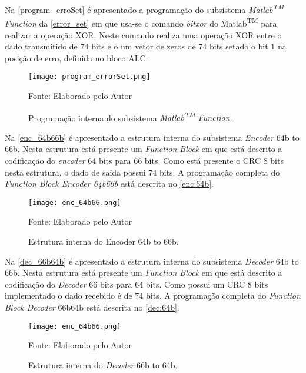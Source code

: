 Na \autoref{program_erroSet} é apresentado a programação do subsistema \textit{Matlab\textsuperscript{TM} Function} da \autoref{error_set} em que usa-se o comando \textit{bitxor} do Matlab\textsuperscript{TM} para realizar a operação XOR. Neste comando realiza uma operação XOR entre o dado transmitido de 74 bits e o um vetor de zeros de 74 bits setado o bit $1$ na posição de erro, definida no bloco ALC. 

\begin{figure}[H]
	\caption{\label{program_erroSet}  Programação interna do subsistema \textit{Matlab\textsuperscript{TM} Function}.} 
	\centering
	\texttt{[image: program\_errorSet.png]}
	\begin{center}
		Fonte: Elaborado pelo Autor
	\end{center}	
\end{figure}

Na \autoref{enc_64b66b} é apresentado a estrutura interna do subsistema \textit{Encoder} 64b to 66b. Nesta estrutura está presente um \textit{Function Block} em que está descrito a codificação do \textit{encoder} 64 bits para 66 bits. Como está presente o CRC 8 bits nesta estrutura, o dado de saída possui 74 bits. A programação completa do \textit{Function Block Encoder 64b66b} está descrita no \autoref{enc:64b}.

\begin{figure}[H]
	\caption{\label{enc_64b66b}  Estrutura interna do Encoder 64b to 66b.}
	\centering
	\texttt{[image: enc\_64b66.png]}
	\begin{center}
		Fonte: Elaborado pelo Autor
	\end{center}	
\end{figure}

Na \autoref{dec_66b64b} é apresentado a estrutura interna do subsistema \textit{Decoder} 64b to 66b. Nesta estrutura está presente um \textit{Function Block} em que está descrito a codificação do \textit{Decoder} 66 bits para 64 bits. Como possui um CRC 8 bits implementado o dado recebido é de 74 bits. A programação completa do \textit{Function Block Decoder} 66b64b está descrita no \autoref{dec:64b}.

\begin{figure}[H]
	\caption{\label{dec_66b64b}  Estrutura interna do \textit{Decoder} 66b to 64b.}
	\centering
	\texttt{[image: enc\_64b66.png]}
	\begin{center}
		Fonte: Elaborado pelo Autor
	\end{center}	
\end{figure}

